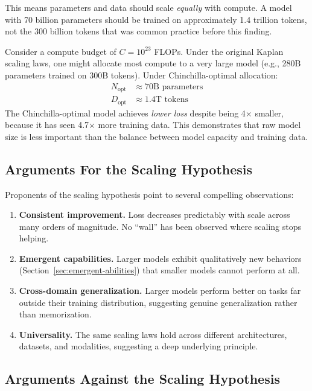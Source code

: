 This means parameters and data should scale \emph{equally} with compute. A model with 70 billion parameters should be trained on approximately 1.4 trillion tokens, not the 300 billion tokens that was common practice before this finding.

\begin{example}
Consider a compute budget of $C = 10^{23}$ FLOPs. Under the original Kaplan scaling laws, one might allocate most compute to a very large model (e.g., 280B parameters trained on 300B tokens). Under Chinchilla-optimal allocation:
\begin{align*}
N_{\text{opt}} &\approx 70\text{B parameters} \\
D_{\text{opt}} &\approx 1.4\text{T tokens}
\end{align*}
The Chinchilla-optimal model achieves \emph{lower loss} despite being 4$\times$ smaller, because it has seen 4.7$\times$ more training data. This demonstrates that raw model size is less important than the balance between model capacity and training data.
\end{example}

\subsection{Arguments For the Scaling Hypothesis}

Proponents of the scaling hypothesis point to several compelling observations:

\begin{enumerate}[leftmargin=1.8em]
  \item \textbf{Consistent improvement.} Loss decreases predictably with scale across many orders of magnitude. No ``wall'' has been observed where scaling stops helping.
  \item \textbf{Emergent capabilities.} Larger models exhibit qualitatively new behaviors (Section~\ref{sec:emergent-abilities}) that smaller models cannot perform at all.
  \item \textbf{Cross-domain generalization.} Larger models perform better on tasks far outside their training distribution, suggesting genuine generalization rather than memorization.
  \item \textbf{Universality.} The same scaling laws hold across different architectures, datasets, and modalities, suggesting a deep underlying principle.
\end{enumerate}

\subsection{Arguments Against the Scaling Hypothesis}

